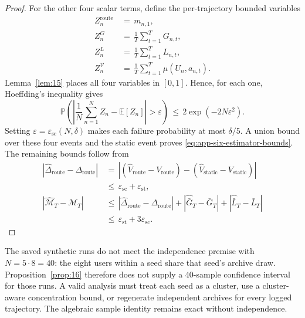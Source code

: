 \documentclass{article} %
\begin{document}
\begin{proof}
For the other four scalar terms, define the per-trajectory bounded variables
\begin{equation}
\label{eq:app-six-proof-Z-defs}
\begin{aligned}
Z_n^{\mathrm{route}}
&\,=\,
m_{n,1},
\\
Z_n^{G}
&\,=\,
\frac{1}{T}\sum_{t=1}^{T}G_{n,t},
\\
Z_n^{L}
&\,=\,
\frac{1}{T}\sum_{t=1}^{T}L_{n,t},
\\
Z_n^{\mathcal{V}}
&\,=\,
\frac{1}{T}\sum_{t=1}^{T}\mu(U_n,a_{n,t}).
\end{aligned}
\end{equation}
Lemma~\ref{lem:15} places all four variables in \([0,1]\). Hence, for each
one, Hoeffding's inequality gives
\begin{equation}
\mathbb{P}\!\left(
\left|
\frac{1}{N}\sum_{n=1}^{N}Z_n-\mathbb{E}[Z_n]
\right|>\varepsilon
\right)
\,\le\,
2\exp(-2N\varepsilon^2).
\end{equation}
Setting \(\varepsilon=\varepsilon_{\mathrm{sc}}(N,\delta)\) makes each
failure probability at most \(\delta/5\). A union bound over these four events
and the static event proves \eqref{eq:app-six-estimator-bounds}. The remaining
bounds follow from
\begin{equation}
\begin{aligned}
\left|
\widehat\Delta_{\mathrm{route}}-\Delta_{\mathrm{route}}
\right|
&\,=\,
\left|
(\widehat V_{\mathrm{route}}-V_{\mathrm{route}})
-
(\widehat V_{\mathrm{static}}-V_{\mathrm{static}})
\right|
\\
&\,\le\,
\varepsilon_{\mathrm{sc}}
+
\varepsilon_{\mathrm{st}},
\\
|\widehat{\mathcal M}_T-\mathcal M_T|
&\,\le\,
|\widehat\Delta_{\mathrm{route}}-\Delta_{\mathrm{route}}|
+
|\widehat{\bar G}_T-\bar G_T|
+
|\widehat{\bar L}_T-\bar L_T|
\\
&\,\le\,
\varepsilon_{\mathrm{st}}+3\varepsilon_{\mathrm{sc}}.
\end{aligned}
\end{equation}
\end{proof}

The saved synthetic runs do not meet the independence premise with
$N=5\cdot8=40$: the eight users within a seed share that seed's archive draw.
Proposition~\ref{prop:16} therefore does not supply a 40-sample confidence
interval for those runs. A valid analysis must treat each seed as a cluster,
use a cluster-aware concentration bound, or regenerate independent archives
for every logged trajectory. The algebraic sample identity remains exact
without independence.
\end{document}
